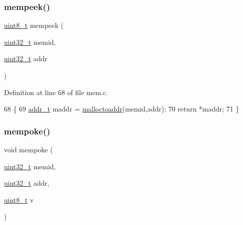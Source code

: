 \subsubsection{\texorpdfstring{mempeek()}{mempeek()}}
{\footnotesize\ttfamily \hyperlink{a00095_aba7bc1797add20fe3efdf37ced1182c5_aba7bc1797add20fe3efdf37ced1182c5}{uint8\+\_\+t} mempeek (\begin{DoxyParamCaption}\item[{\hyperlink{a00095_a435d1572bf3f880d55459d9805097f62_a435d1572bf3f880d55459d9805097f62}{uint32\+\_\+t}}]{memid,  }\item[{\hyperlink{a00095_a435d1572bf3f880d55459d9805097f62_a435d1572bf3f880d55459d9805097f62}{uint32\+\_\+t}}]{addr }\end{DoxyParamCaption})}



Definition at line 68 of file mem.\+c.


\begin{DoxyCode}
68                                                \{
69     \hyperlink{a00095_a295f71165288684c38c6bb836fbb3c59_a295f71165288684c38c6bb836fbb3c59}{addr\_t} maddr = \hyperlink{a00107_ae024364045572d15f9b90b8a046d6807_ae024364045572d15f9b90b8a046d6807}{malloctoaddr}(memid,addr);
70     \textcolor{keywordflow}{return} *maddr;
71 \}
\end{DoxyCode}
\mbox{\label{a00107_a2de854ee97d4e6d27f7aa7899a2d1d32_a2de854ee97d4e6d27f7aa7899a2d1d32}} 
\subsubsection{\texorpdfstring{mempoke()}{mempoke()}}
{\footnotesize\ttfamily void mempoke (\begin{DoxyParamCaption}\item[{\hyperlink{a00095_a435d1572bf3f880d55459d9805097f62_a435d1572bf3f880d55459d9805097f62}{uint32\+\_\+t}}]{memid,  }\item[{\hyperlink{a00095_a435d1572bf3f880d55459d9805097f62_a435d1572bf3f880d55459d9805097f62}{uint32\+\_\+t}}]{addr,  }\item[{\hyperlink{a00095_aba7bc1797add20fe3efdf37ced1182c5_aba7bc1797add20fe3efdf37ced1182c5}{uint8\+\_\+t}}]{v }\end{DoxyParamCaption})}



